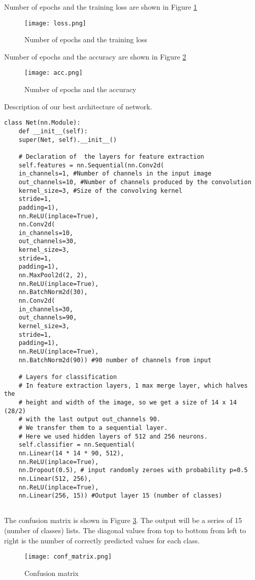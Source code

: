 \documentclass[a4paper, twoside, english]{article}
\begin{document}
Number of epochs and the training loss are shown in Figure \ref{fig:loss}\\
\begin{figure}[h!]
	\centerline{\texttt{[image: loss.png]}}
	\caption[loss]{Number of epochs and the training loss}
	\label{fig:loss}
\end{figure}
Number of epochs and the accuracy are shown in Figure \ref{fig:acc}\\
\begin{figure}[h!]
	\centerline{\texttt{[image: acc.png]}}
	\caption[acc]{Number of epochs and the accuracy}
	\label{fig:acc}
\end{figure}
\newpage
Description of our best architecture of network.\\
\begin{lstlisting}[language=iPython]
	class Net(nn.Module):
	def __init__(self):
	super(Net, self).__init__()
	
	# Declaration of  the layers for feature extraction
	self.features = nn.Sequential(nn.Conv2d(
	in_channels=1, #Number of channels in the input image
	out_channels=10, #Number of channels produced by the convolution
	kernel_size=3, #Size of the convolving kernel
	stride=1,
	padding=1),
	nn.ReLU(inplace=True),
	nn.Conv2d(
	in_channels=10,
	out_channels=30,
	kernel_size=3,
	stride=1,
	padding=1),
	nn.MaxPool2d(2, 2),
	nn.ReLU(inplace=True),
	nn.BatchNorm2d(30),
	nn.Conv2d(
	in_channels=30,
	out_channels=90,
	kernel_size=3,
	stride=1,
	padding=1),
	nn.ReLU(inplace=True),
	nn.BatchNorm2d(90)) #90 number of channels from input
	
	# Layers for classification
	# In feature extraction layers, 1 max merge layer, which halves the
	# height and width of the image, so we get a size of 14 x 14 (28/2)
	# with the last output out_channels 90.
	# We transfer them to a sequential layer.
	# Here we used hidden layers of 512 and 256 neurons.
	self.classifier = nn.Sequential(
	nn.Linear(14 * 14 * 90, 512),
	nn.ReLU(inplace=True),
	nn.Dropout(0.5), # input randomly zeroes with probability p=0.5
	nn.Linear(512, 256),
	nn.ReLU(inplace=True),
	nn.Linear(256, 15)) #Output layer 15 (number of classes)
	
\end{lstlisting}

\newpage
The confusion matrix is shown in Figure \ref{fig:matr}. The output will be a series of 15 (number of classes) lists. The diagonal values from top to bottom from left to right is the number of correctly predicted values for each class.\\
\begin{figure}[h!]
	\centerline{\texttt{[image: conf\_matrix.png]}}
	\caption[matrix]{Confusion matrix}
	\label{fig:matr}
\end{figure}
\end{document}
